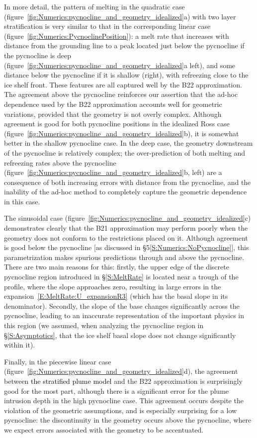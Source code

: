 \documentclass[openacc]{rsproca_new}%
\newcommand{\red}[1]{{\color{red} #1}}
\newcommand{\blue}[1]{{\color{blue} #1}}
\newcommand{\rout}[1]{\red{\st{#1}}}\newcommand{\ab}[1]{\textcolor{Green}{#1}}\newcommand{\about}[1]{\textcolor{Cyan}{\sout{#1}}}
\renewcommand{\rout}[1]{{}} %
\renewcommand{\blue}[1]{{\textcolor{black}{#1}}} %
\renewcommand{\red}[1]{{}} %
\begin{document}
In more detail, the pattern of melting in the quadratic case (figure~\ref{fig:Numerics:pycnocline_and_geometry_idealized}a) with two layer stratification is very similar to that in the corresponding linear case (figure~\ref{fig:Numerics:PycnoclinePosition}): a melt rate that increases with distance from the grounding line to a peak located just below the pycnocline if the pycnocline is deep (figure~\ref{fig:Numerics:pycnocline_and_geometry_idealized}a left), and some distance below the pycnocline if it is shallow (right), with refreezing close to the ice shelf front. These features are all captured well by the B22 approximation. The agreement above the pycnocline reinforces our assertion that the ad-hoc dependence used by the B22 approximation accounts well for geometric variations, provided that the geometry is not overly complex. Although agreement is good for both pycnocline positions in the idealized Ross case (figure~\ref{fig:Numerics:pycnocline_and_geometry_idealized}b), it is somewhat better in the shallow pycnocline case. In the deep case, the geometry downstream of the pycnocline is relatively complex; the over-prediction of both melting and refreezing rates above the pycnocline (figure~\ref{fig:Numerics:pycnocline_and_geometry_idealized}b, left) are a consequence of both increasing errors with distance from the pycnocline, and the inability of the ad-hoc method to completely capture the geometric dependence in this case. 

The sinusoidal case (figure~\ref{fig:Numerics:pycnocline_and_geometry_idealized}c) demonstrates clearly that the B21 approximation may perform poorly when the geometry does not conform to the restrictions placed on it. Although agreement is good below the pycnocline [as discussed in \S5\ref{S:Numerics:NoPycnocline}], this parametrization makes spurious predictions through and above the pycnocline. There are two main reasons for this: firstly, the upper edge of the discrete pycnocline region introduced in \S\ref{S:MeltRate} is located near a trough of the profile, where the slope approaches zero, resulting in large errors in the expansion~\eqref{E:MeltRate:U_expansionR3} (which has the basal slope in its denominator).  Secondly, the slope of the base changes significantly across the pycnocline, leading to an inaccurate representation of the important physics in this region (we assumed, when analyzing the pycnocline region in \S\ref{S:Asymptotics}, that the ice shelf basal slope does not change significantly within it).

Finally, in the piecewise linear case (figure~\ref{fig:Numerics:pycnocline_and_geometry_idealized}d), the agreement between \blue{the stratified plume model}\rout{numerical solutions} and the B22 approximation is surprisingly good for the most part, although there is a significant error for the plume intrusion depth in the high pycnocline case. This agreement occurs despite the violation of the geometric assumptions, and is especially surprising for a low pycnocline: the discontinuity in the geometry occurs above the pycnocline, where we expect errors associated with the geometry to be accentuated. 
\end{document}

